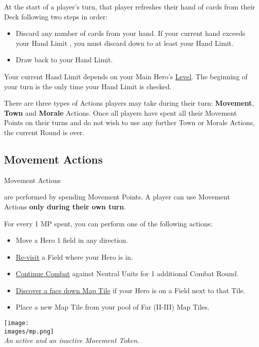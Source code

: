 
\begin{multicols*}{2}

At the start of a player's turn, that player refreshes their hand of cards from their Deck following two steps in order:
\begin{itemize}
  \item Discard any number of cards from your hand.
If your current hand exceeds your Hand Limit , you must discard down to at least your Hand Limit.
  \item Draw back to your Hand Limit.
\end{itemize}
Your current Hand Limit depends on your Main Hero's \hyperlink{Level}{Level}.
The beginning of your turn is the only time your Hand Limit is checked.\par
There are three types of Actions players may take during their turn: \textbf{Movement}, \textbf{Town} and \textbf{Morale} Actions.
Once all players have spent all their Movement Points on their turns and do not wish to use any further Town or Morale Actions, the current Round is over.
\subsection*{Movement Actions}
\hypertarget{Movement}{Movement Actions} are performed by spending Movement Points.
A player can use Movement Actions \textbf{only during their own turn}.\par
For every 1 MP spent, you can perform one of the following actions:
\begin{itemize}
  \item Move a Hero 1 field in any direction.
  \item \hyperlink{Categories}{Re-visit} a Field where your Hero is in.
  \item \hyperlink{Timelimit}{Continue Combat} against Neutral Units for 1 additional Combat Round.
  \item \hyperlink{Placing}{Discover a face down Map Tile} if your Hero is on a Field next to that Tile.
  \item Place a new Map Tile from your pool of Far (II-III) Map Tiles.
\end{itemize}

\begin{center}
  \texttt{[image: \\images/mp.png]}\\
  \medskip
  \footnotesize\textit{An active and an inactive Movement Token.}
\end{center}


\end{multicols*}

